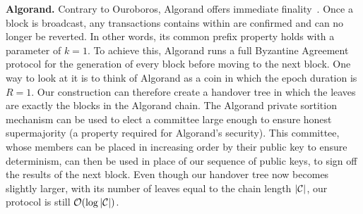 \noindent
\textbf{Algorand.}
Contrary to Ouroboros, Algorand offers immediate finality~\cite{algorand}.
Once a block is broadcast,
any transactions contains within are confirmed and can no longer be reverted. In other
words, its common prefix property holds with a parameter of $k = 1$. To achieve this,
Algorand runs a full Byzantine Agreement protocol for the generation of every block
before moving to the next block. One way to look at it is to think of Algorand as a
coin in which the epoch duration is $R = 1$. Our construction can therefore create a
handover tree in which the leaves are exactly the blocks in the Algorand chain. The
Algorand private sortition mechanism can be used to elect a committee large enough
to ensure honest supermajority (a property required for Algorand's security).
This committee, whose members can be placed in increasing order by their public
key to ensure determinism, can then be used in place of our sequence of public keys,
to sign off the results of the next block. Even though our handover
tree now becomes slightly larger, with its number of leaves equal to the
chain length $|\mathcal{C}|$, our protocol is still $\mathcal{O}(\log|\mathcal{C}|)$.
